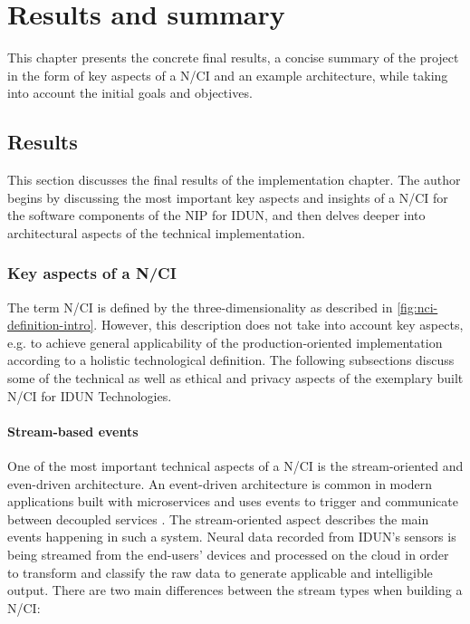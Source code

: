 \chapter{Results and summary}
\graphicspath{{Chapter5/Figs/}{Chapter5/Figs/}}

This chapter presents the concrete final results, a concise summary of the project in the form of key aspects of a N/CI and an example architecture, while taking into account the initial goals and objectives.

\section{Results}
\label{chapter5-results}

This section discusses the final results of the implementation chapter. The author begins by discussing the most important key aspects and insights of a N/CI for the software components of the NIP for IDUN, and then delves deeper into architectural aspects of the technical implementation.

\subsection{Key aspects of a N/CI}
\label{chapter5-key-aspects}

The term N/CI is defined by the three-dimensionality as described in \autoref{fig:nci-definition-intro}. However, this description does not take into account key aspects, e.g. to achieve general applicability of the production-oriented implementation according to a holistic technological definition. The following subsections discuss some of the technical as well as ethical and privacy aspects of the exemplary built N/CI for IDUN Technologies.

\subsubsection{Stream-based events}
\label{chapter5-stream-based-events}

One of the most important technical aspects of a N/CI is the stream-oriented and even-driven architecture. An event-driven architecture is common in modern applications built with microservices and uses events to trigger and communicate between decoupled services \citep{amazon_web_services_inc_event-driven_nodate}. The stream-oriented aspect describes the main events happening in such a system. Neural data recorded from IDUN's sensors is being streamed from the end-users' devices and processed on the cloud in order to transform and classify the raw data to generate applicable and intelligible output. There are two main differences between the stream types when building a N/CI:

